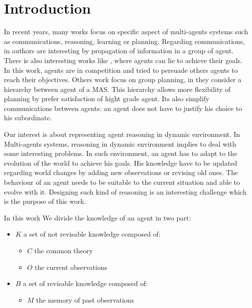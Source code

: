 \documentclass{aamas2012}
\begin{document}



\section{Introduction}

	In recent years, many works focus on specific aspect of multi-agents systems such as communications, reasoning, learning or planning.
	Regarding communications, in \cite{DBLP:conf/ecai/BourgneIM10, DBLP:conf/lads/BourgneIM10} authors are interesting 
	by propagation of information in a group of agent.
	There is also interesting works like \cite{DBLP:conf/ijcai/SakamaSP11}, where agents can lie to achieve their goals.
	In this work, agents are in competition and tried to persuade others agents to reach their objectives.
	Others work focus on group planning, in \cite{DBLP:conf/clima/NieuwenborghVHV06} they consider a hierarchy between agent of a MAS.
	This hierarchy allows more flexibility of planning by prefer satisfaction of hight grade agent.
	Its also simplify communications between agents: an agent does not have to justify his choice to his subordinate.
	
	Our interest is about representing agent reasoning in dynamic environment.
	In Multi-agents systems, reasoning in dynamic environment implies to deal with some interesting problems.
	In such environment, an agent has to adapt to the evolution of the world to achieve his goals.
	His knowledge have to be updated regarding world changes by adding new observations or revising old ones.
	The behaviour of an agent needs to be suitable to the current situation and able to evolve with it.
	Designing such kind of reasoning is an interesting challenge which is the purpose of this work.

	In this work We divide the knowledge of an agent in two part:\newline
		\begin{itemize}
			\item $K$ a set of not revisable knowledge composed of:
			\begin{itemize}
				\item $C$ the common theory
				\item $O$ the current observations
			\end{itemize}
			\item $B$ a set of revisable knowledge composed of:
			\begin{itemize}
				\item $M$ the memory of past observations 
			\end{itemize}
		\end{itemize}
	
\end{document}
